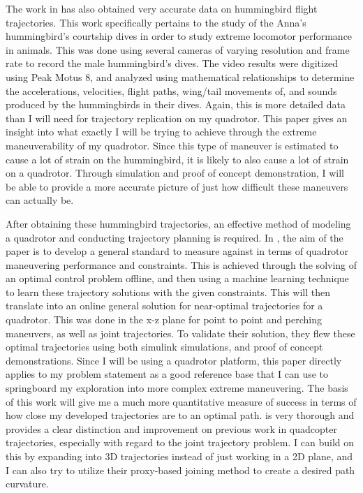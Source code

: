 \documentclass[onecolumn,10pt]{IEEEtran}
\begin{document}
The work in \cite{clark2009courtship} has also obtained very accurate data on hummingbird flight trajectories. This work specifically pertains to the study of the Anna’s hummingbird’s courtship dives in order to study extreme locomotor performance in animals. This was done using several cameras of varying resolution and frame rate to record the male hummingbird’s dives. The video results were digitized using Peak Motus 8, and analyzed using mathematical relationships to determine the accelerations, velocities, flight paths, wing/tail movements of, and sounds produced by the hummingbirds in their dives. Again, this is more detailed data than I will need for trajectory replication on my quadrotor. This paper gives an insight into what exactly I will be trying to achieve through the extreme maneuverability of my quadrotor. Since this type of maneuver is estimated to cause a lot of strain on the hummingbird, it is likely to also cause a lot of strain on a quadrotor. Through simulation and proof of concept demonstration, I will be able to provide a more accurate picture of just how difficult these maneuvers can actually be.

After obtaining these hummingbird trajectories, an effective method of modeling a quadrotor and conducting trajectory planning is required. In \cite{tomic2014learning}, the aim of the paper is to develop a general standard to measure against in terms of quadrotor maneuvering performance and constraints. This is achieved through the solving of an optimal control problem offline, and then using a machine learning technique to learn these trajectory solutions with the given constraints. This will then translate into an online general solution for near-optimal trajectories for a quadrotor. This was done in the x-z plane for point to point and perching maneuvers, as well as joint trajectories. To validate their solution, they flew these optimal trajectories using both simulink simulations, and proof of concept demonstrations. Since I will be using a quadrotor platform, this paper directly applies to my problem statement as a good reference base that I can use to springboard my exploration into more complex extreme maneuvering. The basis of this work will give me a much more quantitative measure of success in terms of how close my developed trajectories are to an optimal path. \cite{tomic2014learning} is very thorough and provides a clear distinction and improvement on previous work in quadcopter trajectories, especially with regard to the joint trajectory problem. I can build on this by expanding into 3D trajectories instead of just working in a 2D plane, and I can also try to utilize their proxy-based joining method to create a desired path curvature.
\end{document}
